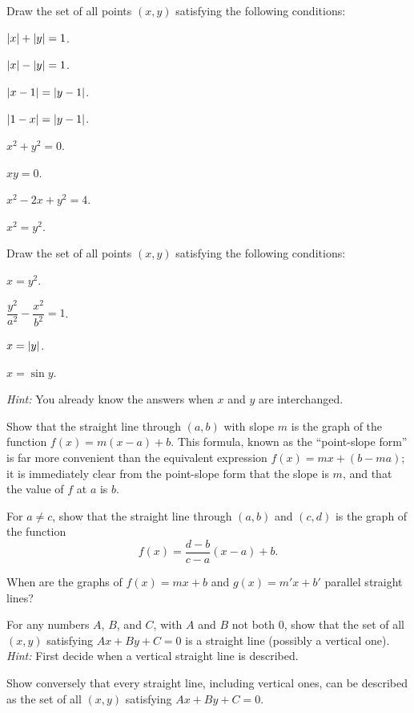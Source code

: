  Draw the set of all points $(x,y)$ satisfying the following
conditions:
\begin{romans}
\item $\lvert x\rvert+\lvert y\rvert=1$.
\item $\lvert x\rvert-\lvert y\rvert=1$.
\item $\lvert x-1\rvert=\lvert y-1\rvert$.
\item $\lvert1-x\rvert=\lvert y-1\rvert$.
\item $x^2+y^2=0$.
\item $xy=0$.
\item $x^2-2x+y^2=4$.
\item $x^2=y^2$.
\end{romans}

 Draw the set of all points $(x,y)$ satisfying the following
conditions:
\begin{romans}
\item $x=y^2$.
\item $\dfrac{y^2}{a^2}-\dfrac{x^2}{b^2}=1$.
\item $x=\lvert y\rvert$.
\item $x=\sin y$.
\end{romans}
\textit{Hint:} You already know the answers when $x$ and $y$ are interchanged.

\begin{letters}
\item Show that the straight line through $(a,b)$ with slope $m$ is the graph
  of the function $f(x)=m(x-a)+b$. This formula, known as the ``point-slope
  form'' is far more convenient than the equivalent expression
  $f(x)=mx+(b-ma)$; it is immediately clear from the point-slope form that the
  slope is $m$, and that the value of $f$ at $a$ is $b$.
\item For $a\neq c$, show that the straight line through $(a,b)$ and $(c,d)$ is
  the graph of the function
  \[
  f(x)=\frac{d-b}{c-a}(x-a)+b.
  \]
\item When are the graphs of $f(x)=mx+b$ and $g(x)=m'x+b'$ parallel straight
  lines?
\end{letters}

\begin{letters}
\item For any numbers $A$, $B$, and $C$, with $A$ and $B$ not both $0$, show
  that the set of all $(x,y)$ satisfying $Ax+By+C=0$ is a straight line
  (possibly a vertical one). \textit{Hint:} First decide when a vertical
  straight line is described.
\item Show conversely that every straight line, including vertical ones, can be
  described as the set of all $(x,y)$ satisfying $Ax+By+C=0$.
\end{letters}

